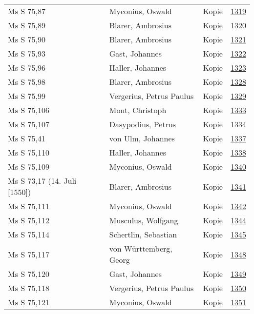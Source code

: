 \documentclass[10pt,a4paper,landscape]{report}
\begin{document}
\begin{longtable}{p{16cm}p{4cm}lr}
Ms S 75,87	&	Myconius, Oswald	&	Kopie	&	\href{http://130.60.24.72/assignment/1319}{1319}\\
Ms S 75,89	&	Blarer, Ambrosius	&	Kopie	&	\href{http://130.60.24.72/assignment/1320}{1320}\\
Ms S 75,90	&	Blarer, Ambrosius	&	Kopie	&	\href{http://130.60.24.72/assignment/1321}{1321}\\
Ms S 75,93	&	Gast, Johannes	&	Kopie	&	\href{http://130.60.24.72/assignment/1322}{1322}\\
Ms S 75,96	&	Haller, Johannes	&	Kopie	&	\href{http://130.60.24.72/assignment/1323}{1323}\\
Ms S 75,98	&	Blarer, Ambrosius	&	Kopie	&	\href{http://130.60.24.72/assignment/1328}{1328}\\
Ms S 75,99	&	Vergerius, Petrus Paulus	&	Kopie	&	\href{http://130.60.24.72/assignment/1329}{1329}\\
Ms S 75,106	&	Mont, Christoph	&	Kopie	&	\href{http://130.60.24.72/assignment/1333}{1333}\\
Ms S 75,107	&	Dasypodius, Petrus	&	Kopie	&	\href{http://130.60.24.72/assignment/1334}{1334}\\
Ms S 75,41	&	von Ulm, Johannes	&	Kopie	&	\href{http://130.60.24.72/assignment/1337}{1337}\\
Ms S 75,110	&	Haller, Johannes	&	Kopie	&	\href{http://130.60.24.72/assignment/1338}{1338}\\
Ms S 75,109	&	Myconius, Oswald	&	Kopie	&	\href{http://130.60.24.72/assignment/1340}{1340}\\
Ms S 73,17 (14. Juli [1550])	&	Blarer, Ambrosius	&	Kopie	&	\href{http://130.60.24.72/assignment/1341}{1341}\\
Ms S 75,111	&	Myconius, Oswald	&	Kopie	&	\href{http://130.60.24.72/assignment/1342}{1342}\\
Ms S 75,112	&	Musculus, Wolfgang	&	Kopie	&	\href{http://130.60.24.72/assignment/1344}{1344}\\
Ms S 75,114	&	Schertlin, Sebastian	&	Kopie	&	\href{http://130.60.24.72/assignment/1345}{1345}\\
Ms S 75,117	&	von Württemberg, Georg	&	Kopie	&	\href{http://130.60.24.72/assignment/1348}{1348}\\
Ms S 75,120	&	Gast, Johannes	&	Kopie	&	\href{http://130.60.24.72/assignment/1349}{1349}\\
Ms S 75,118	&	Vergerius, Petrus Paulus	&	Kopie	&	\href{http://130.60.24.72/assignment/1350}{1350}\\
Ms S 75,121	&	Myconius, Oswald	&	Kopie	&	\href{http://130.60.24.72/assignment/1351}{1351}\\

\end{longtable}
\end{document}
